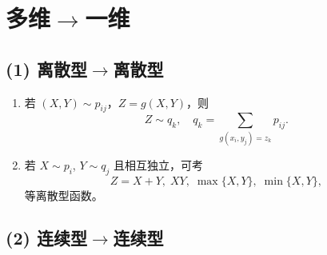 
\section{多维$\rightarrow$一维}

\subsection*{(1) 离散型$\rightarrow$离散型}
\begin{enumerate}
      \item 若 $(X,Y)\sim p_{ij}$，$Z=g(X,Y)$，则
            $$
                  Z\sim q_k, \quad q_k = \sum_{g(x_i,y_j)=z_k} p_{ij}.
            $$
      \item 若 $X\sim p_i$, $Y\sim q_j$ 且相互独立，可考
            $$Z=X+Y,\; XY,\; \max\{X,Y\},\; \min\{X,Y\},$$
            等离散型函数。
\end{enumerate}


\subsection*{(2) 连续型$\rightarrow$连续型}

